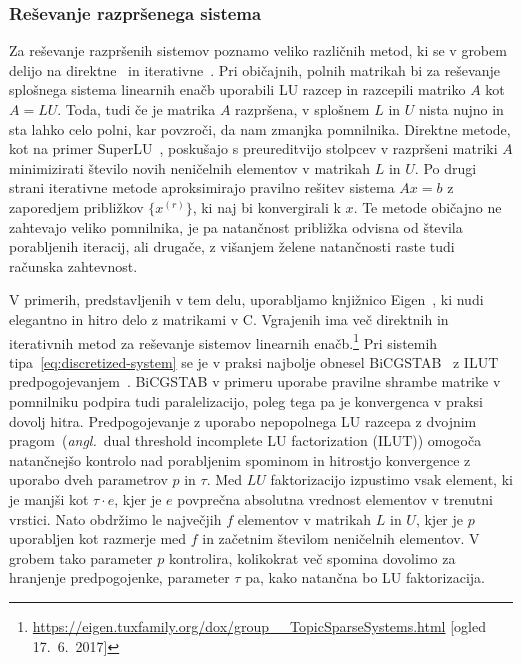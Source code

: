 \documentclass[12pt,a4paper,twoside]{article}
\theoremstyle{definition} %
\theoremstyle{plain} %
\numberwithin{equation}{section}
\newcommand{\ang}[1]{(\hspace{-1.5px}\textit{angl.}\ #1)}
\newcommand{\CC}{C\nolinebreak\hspace{-.05em}\raisebox{.4ex}{\tiny\bf +}\nolinebreak\hspace{-.10em}\raisebox{.4ex}{\tiny\bf +}}
\begin{document}
\subsubsection{Reševanje razpršenega sistema}
\label{sec:solve-sparse}
Za reševanje razpršenih sistemov poznamo veliko različnih metod, ki se v grobem delijo na
direktne~\cite{davis2006direct} in iterativne~\cite{saad2003iterative}. Pri običajnih, polnih
matrikah bi za reševanje splošnega sistema linearnih enačb uporabili LU razcep in razcepili matriko
$A$ kot $A = LU$. Toda, tudi če je matrika $A$ razpršena, v splošnem $L$ in $U$ nista nujno in sta
lahko celo polni, kar povzroči, da nam zmanjka pomnilnika. Direktne metode, kot na primer
SuperLU~\cite{li2005overview}, poskušajo s preureditvijo stolpcev v razpršeni matriki $A$
minimizirati število novih neničelnih elementov v matrikah $L$ in $U$. Po drugi strani iterativne
metode aproksimirajo pravilno rešitev sistema $Ax=b$ z zaporedjem približkov $\{x^{(r)}\}$, ki naj
bi konvergirali k $x$. Te metode običajno ne zahtevajo veliko pomnilnika, je pa natančnost približka
odvisna od števila porabljenih iteracij, ali drugače, z višanjem želene natančnosti raste tudi
računska zahtevnost.

V primerih, predstavljenih v tem delu, uporabljamo knjižnico Eigen~\cite{eigenweb}, ki nudi
elegantno in hitro delo z matrikami v \CC. Vgrajenih ima več direktnih in iterativnih metod za
reševanje sistemov linearnih
enačb.\footnote{\url{https://eigen.tuxfamily.org/dox/group__TopicSparseSystems.html}
[ogled 17.\ 6.\ 2017]}
Pri sistemih tipa~\eqref{eq:discretized-system} se je v praksi najbolje obnesel
BiCGSTAB~\cite{van1992bi} z ILUT predpogojevanjem~\cite{saad1994ilut}. BiCGSTAB v primeru uporabe
pravilne shrambe matrike v pomnilniku podpira tudi paralelizacijo, poleg tega pa je konvergenca v
praksi dovolj hitra. Predpogojevanje z uporabo nepopolnega LU razcepa z dvojnim pragom~\ang{dual
threshold incomplete LU factorization (ILUT)} omogoča natančnejšo kontrolo nad porabljenim spominom
in hitrostjo konvergence z uporabo dveh parametrov $p$ in $\tau$. Med $LU$ faktorizacijo izpustimo
vsak element, ki je manjši kot $\tau\cdot e$, kjer je $e$ povprečna absolutna vrednost elementov v
trenutni vrstici. Nato obdržimo le največjih $f$ elementov v matrikah $L$ in $U$, kjer je $p$
uporabljen kot razmerje med $f$ in začetnim številom neničelnih elementov. V grobem tako parameter
$p$ kontrolira, kolikokrat več spomina dovolimo za hranjenje predpogojenke, parameter $\tau$ pa, kako
natančna bo LU faktorizacija.
\end{document}
